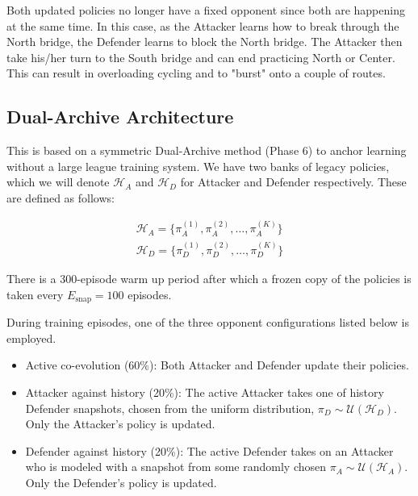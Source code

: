 \documentclass[conference]{IEEEtran}
\begin{document}
  Both updated policies no longer have a fixed opponent since both are happening at the same time. In this case, as the Attacker learns how to break through the North bridge, the Defender learns to block the North bridge. The Attacker then take his/her turn to the South bridge and can end practicing North or Center. This can result in overloading cycling and to "burst" onto a couple of routes.

\subsection{Dual-Archive Architecture}
This is based on a symmetric Dual-Archive method (Phase 6) to anchor learning without a large league training system. We have two banks of legacy policies, which we will denote $\mathcal{H}_A$ and $\mathcal{H}_D$ for Attacker and Defender respectively. These are defined as follows:

\begin{equation}
\begin{split}
\mathcal{H}_A = \{\pi_A^{(1)}, \pi_A^{(2)}, \dots, \pi_A^{(K)}\} \\
\mathcal{H}_D = \{\pi_D^{(1)}, \pi_D^{(2)}, \dots, \pi_D^{(K)}\}
\end{split}
\end{equation}

There is a 300-episode warm up period after which a frozen copy of the policies is taken every $E_{\text{snap}} = 100$ episodes.

During training episodes, one of the three opponent configurations listed below is employed.

\begin{itemize}

\item Active co-evolution (60\%): Both Attacker and Defender update their policies.

\item Attacker against history (20\%): The active Attacker takes one of history Defender snapshots, chosen from the uniform distribution, $\pi_D \sim \mathcal{U}(\mathcal{H}_D)$. Only the Attacker's policy is updated.

\item Defender against history (20\%): The active Defender takes on an Attacker who is modeled with a snapshot from some randomly chosen $\pi_A \sim \mathcal{U}(\mathcal{H}_A)$. Only the Defender's policy is updated.

\end{itemize}
\end{document}
